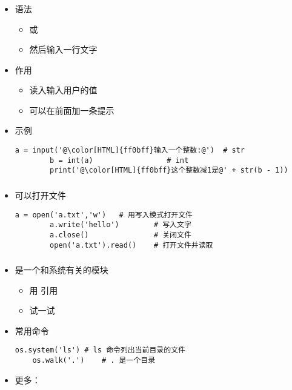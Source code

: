 \begin{CJK}{UTF8}{gbsn}
\begin{frame} [fragile]
	\frametitle{}
	\linespread{1.25}
	\begin{itemize}
	\item 语法
		\begin{itemize}
		\item {} 或 
		\item 然后输入一行文字
		\end{itemize}
	\item 作用
		\begin{itemize}
		\item 读入输入用户的值
		\item 可以在前面加一条提示
		\end{itemize}
	\item 示例
		\begin{lstlisting}[style=pythonstyle, gobble=8, texcl, escapechar=@]
		a = input('@\color[HTML]{ff0bff}输入一个整数:@')	# str
		b = int(a)				   # int
		print('@\color[HTML]{ff0bff}这个整数减1是@' + str(b - 1))
		\end{lstlisting}
	\end{itemize}
\end{frame}

\begin{frame} [fragile]
	\frametitle{}
	\linespread{1.25}
	\begin{itemize}
	\item {}可以打开文件
		\begin{lstlisting}[style=pythonstyle, gobble=8, texcl]
		a = open('a.txt','w')	# 用写入模式打开文件
		a.write('hello')		# 写入文字
		a.close()				# 关闭文件
		open('a.txt').read()	# 打开文件并读取
		\end{lstlisting}
	\end{itemize}
\end{frame}

\begin{frame} [fragile]
	\frametitle{}
	\linespread{1.25}
	\begin{itemize}
	\item {}是一个和系统有关的模块
		\begin{itemize}
		\item 用  引用
		\item 试一试 
		\end{itemize}
	\item 常用命令
	\begin{lstlisting}[style=pythonstyle, gobble=4, texcl]
	os.system('ls')	# ls 命令列出当前目录的文件
	os.walk('.')	# . 是一个目录
	\end{lstlisting}
	\item 更多：
	\end{itemize}
\end{frame}


\end{CJK}
